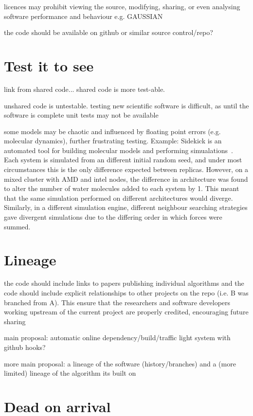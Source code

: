 \documentclass[conference]{IEEEtran}
\begin{document}
licences may prohibit viewing the source, modifying, sharing, or even analysing software performance and behaviour e.g. GAUSSIAN~\cite{Giles2004}

the code should be available on github or similar source control/repo?

\section{Test it to see}
link from shared code... shared code is more test-able. 

unshared code is untestable.  testing new scientific software is
difficult, as until the software is complete unit tests may not be
available

some models may be chaotic and influenced by floating point errors
(e.g. molecular dynamics), further frustrating testing. Example:
Sidekick is an automated tool for building molecular models and
performing simualations~\cite{Hall2014Sidekick}. Each system is
simulated from an different initial random seed, and under most
circumstances this is the only difference expected between
replicas. However, on a mixed cluster with AMD and intel nodes, the
difference in architecture was found to alter the number of water
molecules added to each system by 1. This meant that the same
simulation performed on different architectures would
diverge. Similarly, in a different simulation engine, different
neighbour searching strategies gave divergent simulations due to the
differing order in which forces were summed.



\section{Lineage} 

the code should include links to papers publishing individual
algorithms and the code should include explicit relationships to other
projects on the repo (i.e. B was branched from A). This ensure that
the researchers and software developers working upstream of the
current project are properly credited, encouraging future sharing

main proposal: automatic online dependency/build/traffic light system
with github hooks?

more main proposal: a lineage of the software (history/branches) and a
(more limited) lineage of the algorithm its built on

\section{Dead on arrival}
\end{document}
